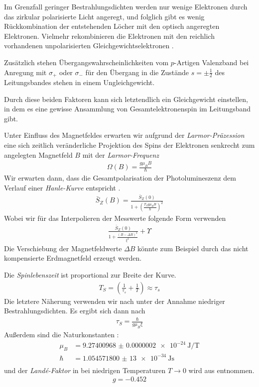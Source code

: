 \documentclass[11pt,twoside=true]{scrartcl}
\begin{document}
Im Grenzfall geringer Bestrahlungsdichten werden nur wenige Elektronen durch
das zirkular polarisierte Licht angeregt, und folglich gibt es wenig 
Rückkombination der entstehenden Löcher mit den optisch angeregten Elektronen.
Vielmehr rekombinieren die Elektronen mit den reichlich vorhandenen 
unpolarisierten Gleichgewichtselektronen . 

Zusätzlich stehen Übergangswahrscheinlichkeiten vom $p$-Artigen Valenzband bei
Anregung mit $\sigma_+$ oder $\sigma_-$ für den Übergang in die Zustände $s =
\pm\frac{1}{2}$ des Leitungsbandes stehen in einem Ungleichgewicht. 

Durch diese beiden Faktoren kann sich letztendlich ein Gleichgewicht einstellen,
in dem es eine gewisse Ansammlung von Gesamtelektronenspin im Leitungsband gibt.

Unter Einfluss des Magnetfeldes erwarten wir aufgrund der \emph{Larmor-Präzession}
eine sich zeitlich veränderliche Projektion des Spins der Elektronen senkrecht
zum angelegten Magnetfeld $B$ mit der \emph{Larmor-Frequenz}
\begin{align*}
  \Omega(B) = \frac{g \mu_B B }{\hbar}
\end{align*}
%
Wir erwarten dann, dass die Gesamtpolarisation
der Photolumineszenz dem Verlauf einer \emph{Hanle-Kurve} entspricht
\cite{fpspindynamik}.
%
\begin{align*}
  \bar{S}_Z(B) = \frac{\bar{S}_Z(0)}{1 + \left( \frac{T_S g \mu_B B}{\hbar} \right)^2}  
\end{align*}
%
Wobei wir für das Interpolieren der Messwerte folgende Form verwenden
%
\begin{align*}
  \frac{\bar{S}_Z(0)}{1 + \frac{(B - \Delta B)^2}{\xi^2}} + \Upsilon 
\end{align*}
%
Die Verschiebung der Magnetfeldwerte $\Delta B$ könnte zum Beispiel 
durch das nicht kompensierte Erdmagnetfeld erzeugt werden.

Die \emph{Spinlebenszeit} ist proportional zur Breite der Kurve.
%
\begin{align} 
  T_S = \left( \frac{1}{\tau_s} + \frac{1}{T} \right)\approx \tau_s
  \label{eq:spinrel}
 \end{align} %
Die letztere Näherung verwenden wir nach \cite{dzhioev2002low} unter
der Annahme niedriger Bestrahlungsdichten.
%
Es ergibt sich dann nach \cite{fpspindynamik}
%
\begin{align*}
  \tau_S = \frac{\hbar}{g \mu_B \xi}
\end{align*}
%
Außerdem sind die Naturkonstanten \cite{mohr2012codata}:
%
\begin{align*}
  \mu_B &= \SI{9.27400968(20)e-24}{\joule\per\tesla} \\
  \hbar &= \SI{1.054 571 800(13)e-34}{\joule\second} \\
\end{align*}
%
und der \emph{Landé-Faktor} in  bei niedrigen Temperaturen $T \to 0$ 
wird aus \cite{zawadzki2008temperature} entnommen.
%
\begin{align*}
  g = -0.452 
\end{align*}
%
\end{document}
